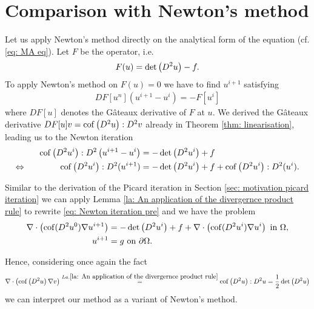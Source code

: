 \section{Comparison with Newton's method}

Let us apply Newton's method directly on the analytical form of the \MA equation (cf. \eqref{eq: MA eq}).
Let $F$ be the \MA operator, i.e. 
\[
	F(u) = \det{\left(D^2 u\right)} -f.
\]
To apply Newton's method on $F(u) =0$ we have to find $u^{i+1}$ satisfying
\begin{align}
	DF[u^n](u^{i+1}-u^i) = -F[u^i]
\end{align}
where $DF[u]$ denotes the G\^ateaux derivative of $F$ at $u$. We derived the G\^ateaux derivative $DF[u] v = \operatorname{cof} \left( D^2 u \right):D^2v$ already in Theorem \ref{thm: linearisation}, leading us to the Newton iteration
\begin{align}
	\operatorname{cof} \left( D^2 u^i \right):D^2\left(u^{i+1}-u^i\right) &= -\det{\left(D^2 u^i\right)}+f \nonumber \\
	\Leftrightarrow \qquad \qquad  \operatorname{cof} \left( D^2 u^i \right):D^2(u^{i+1}) &= -\det{\left(D^2 u^i\right)} +f  +\operatorname{cof} \left( D^2 u^i \right):D^2(u^i). \label{eq: Newton iteration pre}
\end{align}

Similar to the derivation of the Picard iteration in Section \ref{sec: motivation picard iteration} we can apply Lemma \ref{la: An application of the divergernce product rule} to rewrite \eqref{eq: Newton iteration pre} and we have the problem
\begin{align}
	\nabla \cdot \left( \operatorname{cof}(D^2 u^0) \nabla u^{i+1} \right) &= -\det{\left(D^2u^i\right)} +f+\nabla \cdot \left( \operatorname{cof}(D^2 u^i) \nabla u^{i} \right)  \textnormal{ in } \Omega,  \label{eq: Newton iteration}\\
	u^{i+1} &= g \textnormal{ on } \partial \Omega .
\end{align}

Hence, considering once again the fact 
\[
\nabla \cdot \left( \operatorname{cof} \left( D^2 u  \right) \nabla v \right)
\stackrel{La.\ref{la: An application of the divergernce product rule}}=\operatorname{cof} \left( D^2 u \right):D^2u
=\frac 1 2 \det{\left(D^2u\right)}
\]
we can interpret our method as a variant of Newton's method. 

